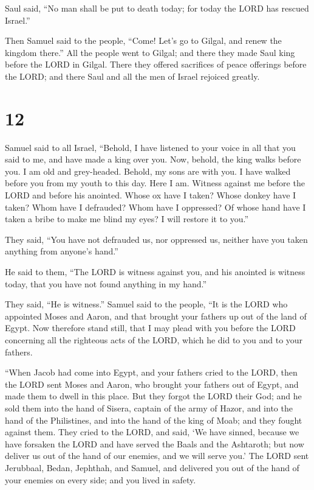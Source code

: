  Saul said, ``No man shall be put to death today; for
today the LORD has rescued Israel.''

 Then Samuel said to the people, ``Come! Let's go to
Gilgal, and renew the kingdom there.''  All the people
went to Gilgal; and there they made Saul king before the LORD in Gilgal.
There they offered sacrifices of peace offerings before the LORD; and
there Saul and all the men of Israel rejoiced greatly.

\hypertarget{section-11}{%
\section{12}\label{section-11}}

 Samuel said to all Israel, ``Behold, I have listened to
your voice in all that you said to me, and have made a king over you.
 Now, behold, the king walks before you. I am old and
grey-headed. Behold, my sons are with you. I have walked before you from
my youth to this day.  Here I am. Witness against me
before the LORD and before his anointed. Whose ox have I taken? Whose
donkey have I taken? Whom have I defrauded? Whom have I oppressed? Of
whose hand have I taken a bribe to make me blind my eyes? I will restore
it to you.''

 They said, ``You have not defrauded us, nor oppressed us,
neither have you taken anything from anyone's hand.''

 He said to them, ``The LORD is witness against you, and
his anointed is witness today, that you have not found anything in my
hand.''

They said, ``He is witness.''  Samuel said to the people,
``It is the LORD who appointed Moses and Aaron, and that brought your
fathers up out of the land of Egypt.  Now therefore stand
still, that I may plead with you before the LORD concerning all the
righteous acts of the LORD, which he did to you and to your fathers.

 ``When Jacob had come into Egypt, and your fathers cried
to the LORD, then the LORD sent Moses and Aaron, who brought your
fathers out of Egypt, and made them to dwell in this place.
 But they forgot the LORD their God; and he sold them into
the hand of Sisera, captain of the army of Hazor, and into the hand of
the Philistines, and into the hand of the king of Moab; and they fought
against them.  They cried to the LORD, and said, `We have
sinned, because we have forsaken the LORD and have served the Baals and
the Ashtaroth; but now deliver us out of the hand of our enemies, and we
will serve you.'  The LORD sent Jerubbaal, Bedan,
Jephthah, and Samuel, and delivered you out of the hand of your enemies
on every side; and you lived in safety.

